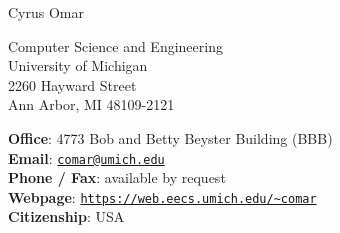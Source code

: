 \documentclass[10pt,letterpaper]{article}
\def\name{Cyrus Omar}
\renewenvironment{itemize}{
  \begin{list}{}{
    \setlength{\leftmargin}{1.25em}
    \setlength{\itemsep}{0.25em}
    \setlength{\parskip}{0pt}
    \setlength{\parsep}{0.2em}
  }
}{
  \end{list}
}
\begin{document}
{\LARGE \name}


\bigskip

\begin{minipage}[t]{0.495\textwidth}
  Computer Science and Engineering\\
  University of Michigan\\
  2260 Hayward Street\\
  Ann Arbor, MI 48109-2121
\end{minipage}
\begin{minipage}[t]{0.495\textwidth}
  \textbf{Office}: 4773 Bob and Betty Beyster Building (BBB) \\
  \textbf{Email}: \href{mailto:comar@umich.edu}{\texttt{comar@umich.edu}} \\
  \textbf{Phone / Fax}: available by request\\
  \textbf{Webpage}: \href{https://web.eecs.umich.edu/~comar}{\texttt{https://web.eecs.umich.edu/\textasciitilde comar}} \\
  \textbf{Citizenship}: USA
\end{minipage}


\end{document}
